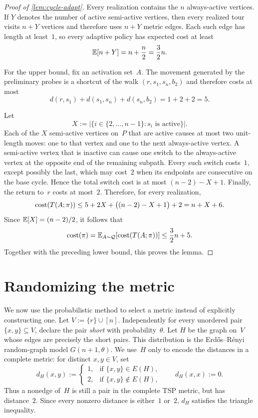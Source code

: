 \documentclass[12pt,a4paper,oneside]{report}
\begin{document}
\begin{proof}[Proof of \cref{lem:cycle-adapt}]
Every realization contains the $n$ always-active vertices.  If $Y$ denotes the
number of active semi-active vertices, then every realized tour visits $n+Y$
vertices and therefore uses $n+Y$ metric edges.  Each such edge has length at
least~$1$, so every adaptive policy has expected cost at least
\[
    \mathbb{E}[n+Y]=n+\frac n2=\frac32n.
\]

For the upper bound, fix an activation set~$A$.  The movement
generated by the preliminary probes is a shortcut of the walk
$(r,s_1,s_n,b_2)$ and therefore costs at most
\[
    d(r,s_1)+d(s_1,s_n)+d(s_n,b_2)
    =1+2+2=5.
\]

Let
\[
    X:=\bigl|\{i\in\{2,\dots,n-1\}:s_i\text{ is active}\}\bigr|.
\]
Each of the $X$ semi-active vertices on~$P$ that are active causes at most two
unit-length moves: one to that vertex and one to the next always-active
vertex.  A semi-active vertex that is inactive can cause one switch to the
always-active vertex at the opposite end of the remaining subpath.  Every
such switch costs~$1$, except possibly the last, which may cost~$2$ when its endpoints
are consecutive on the base cycle.  Hence the total switch cost is at most
$(n-2)-X+1$.  Finally, the return to~$r$ costs at most~$2$.  Therefore, for
every realization,
\[
    \operatorname{cost}(T(A;\pi))
    \le
    5+2X+\bigl((n-2)-X+1\bigr)+2
    =n+X+6.
\]
Since $\mathbb{E}[X]=(n-2)/2$, it follows that
\[
    \operatorname{cost}(\pi)=\mathbb{E}_{A\sim\mathcal Q}[\operatorname{cost}(T(A;\pi))]
    \le \frac32n+5.
\]
Together with the preceding lower bound, this proves the lemma.
\end{proof}

\section{Randomizing the metric}
\label{sec:random-metric-gap}

We now use the probabilistic method to select a metric instead of explicitly 
constructing one.  Let $V:=\{r\}\cup[n]$.  Independently for every
unordered pair $\{x,y\}\subseteq V$, declare the pair \emph{short} with
probability~$\theta$.  Let $H$ be the graph on~$V$ whose edges are precisely
the short pairs.  This distribution is the Erd\H{o}s--R\'enyi random-graph
model $G(n+1,\theta)$.  We use~$H$ only to encode the distances in a complete
metric: for distinct $x,y\in V$, set
\[
    d_H(x,y)
    :=
    \begin{cases}
        1, & \text{if } \{x,y\}\in E(H),\\
        2, & \text{if } \{x,y\}\notin E(H),
    \end{cases}
    \qquad
    d_H(x,x):=0.
\]
Thus a nonedge of~$H$ is still a pair in the complete TSP metric, but has
distance~$2$.  Since every nonzero distance is either~$1$ or~$2$, $d_H$
satisfies the triangle inequality.
\end{document}
